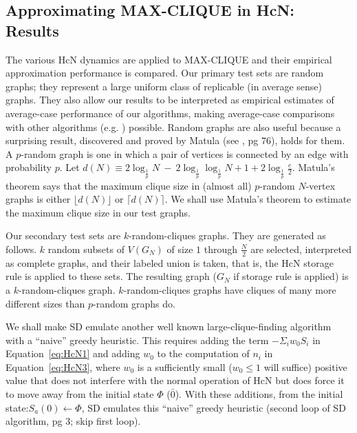 \subsection*{Approximating MAX-CLIQUE in HcN: Results}
The various HcN dynamics are applied to MAX-CLIQUE and 
their empirical approximation performance is compared.
Our primary test sets are random graphs; they represent a large
uniform class of replicable (in average sense) graphs. 
They also allow 
our results to be interpreted as empirical estimates of average-case 
performance of our algorithms, making average-case comparisons with other
algorithms (e.g. \cite{kn:BaY86}) possible.
Random graphs are also useful because 
a surprising result, discovered
and proved by Matula (see \cite{kn:Pal85}, pg 76), holds for them.
A $p$-random graph is one in which a
pair of vertices is connected by an edge with probability $p$.
Let 
$d(N) \equiv 2 \log_{\frac{1}{p}} N~-~2 \log_{\frac{1}{p}} \log_{\frac{1}{p}} N + 1 + 2 \log_{\frac{1}{p}} \frac{e}{2}$.
Matula's
theorem says that the maximum clique size in (almost all) $p$-random $N$-vertex
graphs is either $\lfloor d(N) \rfloor$ or $\lceil d(N) \rceil$.
We shall use Matula's theorem to estimate the maximum clique size in
our test graphs.
\par
Our secondary test sets are $k$-random-cliques graphs.
They are generated as follows. $k$ random
subsets of $V(G_N)$ of size $1$ through $\frac{N}{2}$ are selected, interpreted as complete
graphs, and their labeled union is taken, that is, 
the HcN storage rule is applied to these sets.
The resulting graph ($G_N$ if storage rule is applied)
is a $k$-random-cliques graph. 
$k$-random-cliques graphs have cliques of many more different sizes 
than $p$-random graphs do.
\par
We shall make SD emulate another well known large-clique-finding algorithm
with a ``naive'' greedy heuristic. 
This requires adding the
term $- \Sigma_i w_0 S_i$ in Equation~\ref{eq:HcN1} and adding $w_0$
to the computation of $n_i$ in Equation~\ref{eq:HcN3}, where $w_0$
is a sufficiently small ($w_0 \leq 1$ will suffice) positive value that does not interfere with
the normal operation of HcN but does force it to move away from
the initial state $\Phi$ ($\bar{0}$). With these additions,
from the initial state:$S_a(0) \leftarrow \Phi$, SD emulates this ``naive''
greedy heuristic (second loop of SD algorithm, pg 3; skip first loop). 
